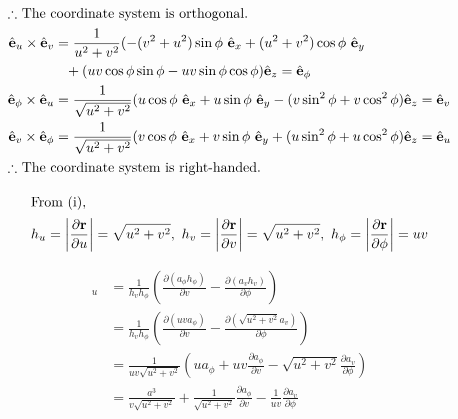 \documentclass[12pt]{article}
\newenvironment{problem}[2][Problem]{\begin{trivlist}
\item[\hskip \labelsep {\bfseries #1}\hskip \labelsep {\bfseries #2.}]}{\end{trivlist}}
\begin{document}
\begin{align*}
	\intertext{$\therefore$ The coordinate system is orthogonal.}
	\hat{\mathbf{e}}_u \times \hat{\mathbf{e}}_v &= \frac{1}{u^2 + v^2}
		(-(v^2+u^2)\sin\phi\ \hat{\mathbf{e}}_x + (u^2 + v^2)\cos\phi\
		\hat{\mathbf{e}}_y \\
	&\phantom{=} + (uv\cos\phi\sin\phi - uv\sin\phi\cos\phi)
		\hat{\mathbf{e}}_z = \hat{\mathbf{e}}_\phi \\
	\hat{\mathbf{e}}_\phi \times \hat{\mathbf{e}}_u &= \frac{1}{\sqrt{u^2 + v^2}}
		(u\cos\phi\ \hat{\mathbf{e}}_x + u\sin\phi\ \hat{\mathbf{e}}_y
		- (v\sin^2\phi + v\cos^2\phi) \hat{\mathbf{e}}_z = \hat{\mathbf{e}}_v \\
	\hat{\mathbf{e}}_v \times \hat{\mathbf{e}}_\phi &= \frac{1}{\sqrt{u^2 + v^2}}
		(v\cos\phi\ \hat{\mathbf{e}}_x + v\sin\phi\ \hat{\mathbf{e}}_y
		+ (u\sin^2\phi + u\cos^2\phi) \hat{\mathbf{e}}_z = \hat{\mathbf{e}}_u \\
	\intertext{$\therefore$ The coordinate system is right-handed.}
\end{align*}
\filbreak

\begin{problem}{2.e.ii}
\end{problem}
\begin{gather*}
	\shortintertext{From (i),}
	h_u = \left| \frac{\partial \mathbf{r}}{\partial u} \right| = \sqrt{u^2 + v^2},\
	h_v =\left| \frac{\partial \mathbf{r}}{\partial v} \right| = \sqrt{u^2 + v^2},\
	h_\phi =\left| \frac{\partial \mathbf{r}}{\partial \phi} \right| = uv \\
\end{gather*}
\filbreak

\begin{problem}{2.e.iii}
\end{problem}
\begin{align*}
	[\nabla \times \mathbf{a}]_u &= \frac{1}{h_vh_\phi} \left( \frac{\partial
		(a_\phi h_\phi)} {\partial v} - \frac{\partial (a_vh_v)}{\partial \phi}
		\right) \\
	&= \frac{1}{h_vh_\phi} \left( \frac{\partial (uva_\phi)} {\partial v}
		- \frac{\partial (\sqrt{u^2+v^2}a_v)}{\partial \phi} \right) \\
	&= \frac{1}{uv\sqrt{u^2+v^2}} \left( ua_\phi + uv\frac{\partial a_\phi}
		{\partial v} - \sqrt{u^2+v^2} \frac{\partial a_v}{\partial \phi} \right) \\
	&= \frac{a^3}{v\sqrt{u^2+v^2}} + \frac{1}{\sqrt{u^2+v^2}} \frac{\partial
		a_\phi} {\partial v} - \frac{1}{uv} \frac{\partial a_v}{\partial \phi} \\
\end{align*}
\filbreak
\end{document}
